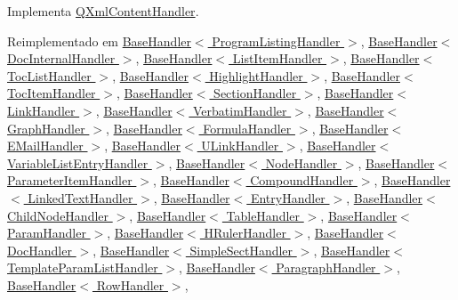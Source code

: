 Implementa \hyperlink{class_q_xml_content_handler_a96c291d0d5554a03b2cc445472dd1086}{Q\-Xml\-Content\-Handler}.



Reimplementado em \hyperlink{class_base_handler_a4f1b47ade1d77cb973e68738af8c422f}{Base\-Handler$<$ Program\-Listing\-Handler $>$}, \hyperlink{class_base_handler_a4f1b47ade1d77cb973e68738af8c422f}{Base\-Handler$<$ Doc\-Internal\-Handler $>$}, \hyperlink{class_base_handler_a4f1b47ade1d77cb973e68738af8c422f}{Base\-Handler$<$ List\-Item\-Handler $>$}, \hyperlink{class_base_handler_a4f1b47ade1d77cb973e68738af8c422f}{Base\-Handler$<$ Toc\-List\-Handler $>$}, \hyperlink{class_base_handler_a4f1b47ade1d77cb973e68738af8c422f}{Base\-Handler$<$ Highlight\-Handler $>$}, \hyperlink{class_base_handler_a4f1b47ade1d77cb973e68738af8c422f}{Base\-Handler$<$ Toc\-Item\-Handler $>$}, \hyperlink{class_base_handler_a4f1b47ade1d77cb973e68738af8c422f}{Base\-Handler$<$ Section\-Handler $>$}, \hyperlink{class_base_handler_a4f1b47ade1d77cb973e68738af8c422f}{Base\-Handler$<$ Link\-Handler $>$}, \hyperlink{class_base_handler_a4f1b47ade1d77cb973e68738af8c422f}{Base\-Handler$<$ Verbatim\-Handler $>$}, \hyperlink{class_base_handler_a4f1b47ade1d77cb973e68738af8c422f}{Base\-Handler$<$ Graph\-Handler $>$}, \hyperlink{class_base_handler_a4f1b47ade1d77cb973e68738af8c422f}{Base\-Handler$<$ Formula\-Handler $>$}, \hyperlink{class_base_handler_a4f1b47ade1d77cb973e68738af8c422f}{Base\-Handler$<$ E\-Mail\-Handler $>$}, \hyperlink{class_base_handler_a4f1b47ade1d77cb973e68738af8c422f}{Base\-Handler$<$ U\-Link\-Handler $>$}, \hyperlink{class_base_handler_a4f1b47ade1d77cb973e68738af8c422f}{Base\-Handler$<$ Variable\-List\-Entry\-Handler $>$}, \hyperlink{class_base_handler_a4f1b47ade1d77cb973e68738af8c422f}{Base\-Handler$<$ Node\-Handler $>$}, \hyperlink{class_base_handler_a4f1b47ade1d77cb973e68738af8c422f}{Base\-Handler$<$ Parameter\-Item\-Handler $>$}, \hyperlink{class_base_handler_a4f1b47ade1d77cb973e68738af8c422f}{Base\-Handler$<$ Compound\-Handler $>$}, \hyperlink{class_base_handler_a4f1b47ade1d77cb973e68738af8c422f}{Base\-Handler$<$ Linked\-Text\-Handler $>$}, \hyperlink{class_base_handler_a4f1b47ade1d77cb973e68738af8c422f}{Base\-Handler$<$ Entry\-Handler $>$}, \hyperlink{class_base_handler_a4f1b47ade1d77cb973e68738af8c422f}{Base\-Handler$<$ Child\-Node\-Handler $>$}, \hyperlink{class_base_handler_a4f1b47ade1d77cb973e68738af8c422f}{Base\-Handler$<$ Table\-Handler $>$}, \hyperlink{class_base_handler_a4f1b47ade1d77cb973e68738af8c422f}{Base\-Handler$<$ Param\-Handler $>$}, \hyperlink{class_base_handler_a4f1b47ade1d77cb973e68738af8c422f}{Base\-Handler$<$ H\-Ruler\-Handler $>$}, \hyperlink{class_base_handler_a4f1b47ade1d77cb973e68738af8c422f}{Base\-Handler$<$ Doc\-Handler $>$}, \hyperlink{class_base_handler_a4f1b47ade1d77cb973e68738af8c422f}{Base\-Handler$<$ Simple\-Sect\-Handler $>$}, \hyperlink{class_base_handler_a4f1b47ade1d77cb973e68738af8c422f}{Base\-Handler$<$ Template\-Param\-List\-Handler $>$}, \hyperlink{class_base_handler_a4f1b47ade1d77cb973e68738af8c422f}{Base\-Handler$<$ Paragraph\-Handler $>$}, \hyperlink{class_base_handler_a4f1b47ade1d77cb973e68738af8c422f}{Base\-Handler$<$ Row\-Handler $>$}, 